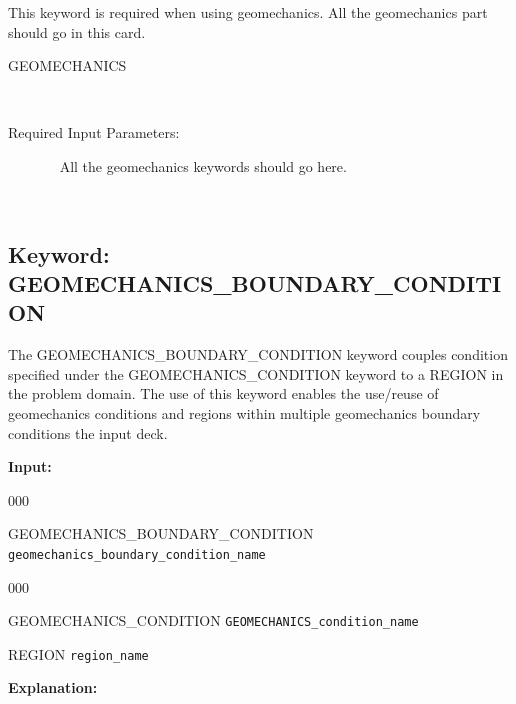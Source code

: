 \hfill\hyperlink{target_key}{\return}

 This keyword is required when using geomechanics. All the geomechanics part should go in this card.

\begin{description}
\item[GEOMECHANICS]~
\item[Required Input Parameters:]~
All the geomechanics keywords  should go here.
\item[\keyend] ~

\end{description}


\newpage
\protect\hypertarget{target_geomech_bc}{}
 
\subsection{Keyword: GEOMECHANICS\_BOUNDARY\_CONDITION}

\hfill\hyperlink{target_key}{\return}

The GEOMECHANICS\_BOUNDARY\_CONDITION keyword couples condition specified under the GEOMECHANICS\_CONDITION keyword to a REGION in the problem domain.  The use of this keyword enables the use/reuse of geomechanics conditions and regions within multiple geomechanics boundary conditions the input deck.

{\noindent\bf Input:}

\begin{deflist}{000}
\item[GEOMECHANICS\_BOUNDARY\_CONDITION] {\tt geomechanics\_boundary\_condition\_name}
\begin{deflist}{000}
\item[GEOMECHANICS\_CONDITION] {\tt GEOMECHANICS\_condition\_name}
\item[REGION] {\tt region\_name}
\end{deflist}
\item[\keyend]
\end{deflist}

{\noindent\bf Explanation:}

